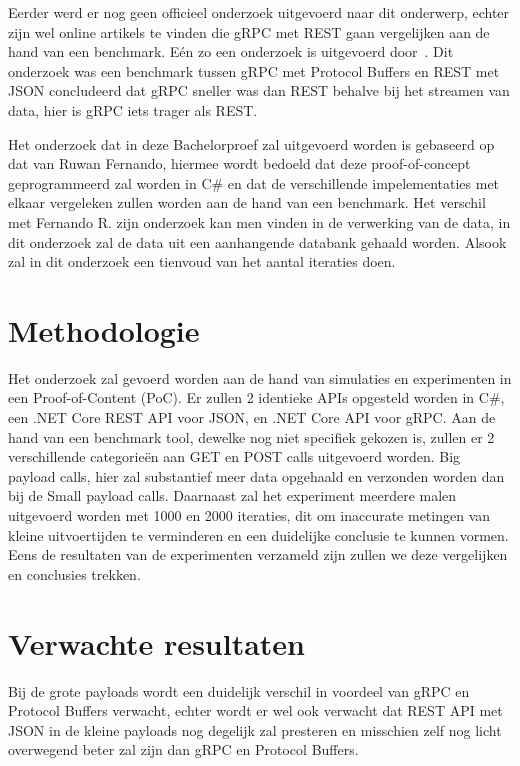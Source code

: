 Eerder werd er nog geen officieel onderzoek uitgevoerd naar dit onderwerp, echter zijn wel online artikels te vinden die gRPC met REST gaan vergelijken aan de hand van een benchmark. Eén zo een onderzoek is uitgevoerd door~\textcite{Fernando2019}. Dit onderzoek was een benchmark tussen gRPC met Protocol Buffers en REST met JSON concludeerd dat gRPC sneller was dan REST behalve bij het streamen van data, hier is gRPC iets trager als REST.

Het onderzoek dat in deze Bachelorproef zal uitgevoerd worden is gebaseerd op dat van Ruwan Fernando, hiermee wordt bedoeld dat deze proof-of-concept geprogrammeerd zal worden in C\# en dat de  verschillende impelementaties met elkaar vergeleken zullen worden aan de hand van een benchmark. Het verschil met Fernando R. zijn onderzoek kan men vinden in de verwerking van de data, in dit onderzoek zal de data uit een aanhangende databank gehaald worden. Alsook zal in dit onderzoek een tienvoud van het aantal iteraties doen.


\section{Methodologie}
\label{sec:methodologie}
Het onderzoek zal gevoerd worden aan de hand van simulaties en experimenten in een Proof-of-Content (PoC). Er zullen 2 identieke APIs opgesteld worden in C\#, een .NET Core REST API voor JSON, en .NET Core API voor gRPC. Aan de hand van een benchmark tool, dewelke nog niet specifiek gekozen is, zullen er 2 verschillende categorieën aan GET en POST calls uitgevoerd worden. Big payload calls, hier zal substantief meer data opgehaald en verzonden worden dan bij de Small payload calls. Daarnaast zal het experiment meerdere malen uitgevoerd worden met 1000 en 2000 iteraties, dit om inaccurate metingen van kleine uitvoertijden te verminderen en een duidelijke conclusie te kunnen vormen.
Eens de resultaten van de experimenten verzameld zijn zullen we deze vergelijken en conclusies trekken.
\section{Verwachte resultaten}
\label{sec:verwachte_resultaten}
Bij de grote payloads wordt een duidelijk verschil in voordeel van gRPC en Protocol Buffers verwacht, echter wordt er wel ook verwacht dat REST API met JSON in de kleine payloads nog degelijk zal presteren en misschien zelf nog licht overwegend beter zal zijn dan gRPC en Protocol Buffers.

